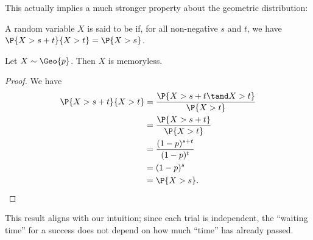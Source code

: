 This actually implies a much stronger property about the geometric distribution:

\begin{definition}
    A random variable $X$ is said to be  if, for all non-negative $s$ and $t$, we have $\P{X > s + t}{X > t} = \P{X > s}$.
\end{definition}

\begin{proposition}
    Let $X \sim \Geo{p}$. Then $X$ is memoryless.
\end{proposition}
\begin{proof}
    We have
    \begin{align*}
        \P{X > s + t}{X > t} &= \frac{\P{X > s + t \tand X > t}}{\P{X > t}}\\
        &= \frac{\P{X > s + t}}{\P{X > t}}\\
        &= \frac{(1-p)^{s+t}}{(1-p)^t}\\
        &= (1-p)^s\\
        &= \P{X > s}.
    \end{align*}
\end{proof}

This result aligns with our intuition; since each trial is independent, the ``waiting time'' for a success does not depend on how much ``time'' has already passed.

